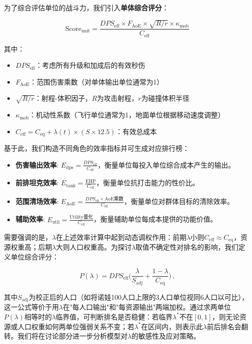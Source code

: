 \documentclass[a4paper,12pt]{article}
\begin{document}
\begin{CJK}{UTF8}{gbsn}
为了综合评估单位的战斗力，我们引入\textbf{单体综合评分}：

$$
\text{Score}_{\text{unit}} = \frac{DPS_{\text{eff}} \times F_{\text{AoE}} \times \sqrt{R/r} \times \kappa_{\text{mob}}}{C_{\text{eff}}}
$$

其中：
\begin{itemize}
\item $DPS_{\text{eff}}$：考虑所有升级和加成后的有效秒伤
\item $F_{\text{AoE}}$：范围伤害乘数（对单体输出单位通常为1）
\item $\sqrt{R/r}$：射程-体积因子，$R$为攻击射程，$r$为碰撞体积半径
\item $\kappa_{\text{mob}}$：机动性系数（飞行单位通常为1，地面单位根据移动速度调整）
\item $C_{\text{eff}} = C_{\text{eq}} + \lambda(t) \times (S \times 12.5)$：有效总成本
\end{itemize}

基于此，我们构造不同角色的效率指标并可生成对应排行榜：
\begin{itemize}
\item \textbf{伤害输出效率}: $\displaystyle E_{\text{dps}} = \frac{DPS_{\text{eff}}}{C_{\text{eff}}}$，衡量单位每投入单位综合成本产生的输出。
\item \textbf{前排坦克效率}: $\displaystyle E_{\text{tank}} = \frac{\text{EHP}}{C_{\text{eff}}}$，衡量单位抗打击能力的性价比。
\item \textbf{范围清场效率}: $\displaystyle E_{\text{AoE}} = \frac{DPS_{\text{eff}}\times \text{AoE乘数}}{C_{\text{eff}}}$，衡量单位对群体目标的清除效率。
\item \textbf{辅助效率}: $\displaystyle E_{\text{util}} = \frac{\text{Utility量化}}{C_{\text{eff}}}$，衡量辅助单位每成本提供的功能价值。
\end{itemize}

需要强调的是，$\lambda$在上述效率计算中起到动态调权作用：前期$\lambda$小则$C_{\text{eff}}\approx C_{\text{eq}}$，资源权重高；后期$\lambda$大则人口权重高。为探讨$\lambda$取值不确定性对排名的影响，我们定义单位综合评分：

$$
P(\lambda) = DPS_{\text{eff}}\Big(\frac{\lambda}{S_{\text{adj}}} + \frac{1-\lambda}{C_{\text{eq}}}\Big)\,,
$$

其中$S_{\text{adj}}$为校正后的人口（如将诺娃100人口上限的3人口单位视同6人口以可比），这一公式等价于用$\lambda$在"每人口输出"和"每资源输出"两端加权。通过求两单位$P(\lambda)$相等时的$\lambda$临界值，可判断排名是否稳健：若临界$\lambda^*$不在$[0,1]$，则无论资源或人口权重如何两单位强弱关系不变；若$\lambda^*$在区间内，则表示此$\lambda$前后排名会翻转。我们将在讨论部分进一步分析模型对$\lambda$的敏感性及应对策略。


\end{CJK}
\end{document}
